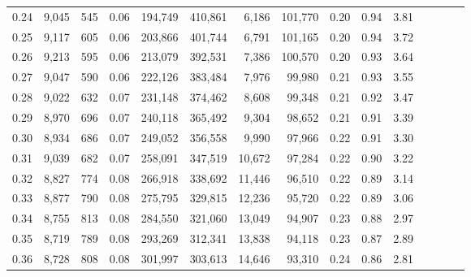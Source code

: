 \begin{tabular}{rrrcrrrrrrrrrrr}
0.24 &  9,045 &    545 &                                       0.06 &  194,749 &  410,861 &    6,186 &  101,770 &  0.20 &  0.94 &                         3.81 \\
0.25 &  9,117 &    605 &                                       0.06 &  203,866 &  401,744 &    6,791 &  101,165 &  0.20 &  0.94 &                         3.72 \\
0.26 &  9,213 &    595 &                                       0.06 &  213,079 &  392,531 &    7,386 &  100,570 &  0.20 &  0.93 &                         3.64 \\
0.27 &  9,047 &    590 &                                       0.06 &  222,126 &  383,484 &    7,976 &   99,980 &  0.21 &  0.93 &                         3.55 \\
0.28 &  9,022 &    632 &                                       0.07 &  231,148 &  374,462 &    8,608 &   99,348 &  0.21 &  0.92 &                         3.47 \\
0.29 &  8,970 &    696 &                                       0.07 &  240,118 &  365,492 &    9,304 &   98,652 &  0.21 &  0.91 &                         3.39 \\
0.30 &  8,934 &    686 &                                       0.07 &  249,052 &  356,558 &    9,990 &   97,966 &  0.22 &  0.91 &                         3.30 \\
0.31 &  9,039 &    682 &                                       0.07 &  258,091 &  347,519 &   10,672 &   97,284 &  0.22 &  0.90 &                         3.22 \\
0.32 &  8,827 &    774 &                                       0.08 &  266,918 &  338,692 &   11,446 &   96,510 &  0.22 &  0.89 &                         3.14 \\
0.33 &  8,877 &    790 &                                       0.08 &  275,795 &  329,815 &   12,236 &   95,720 &  0.22 &  0.89 &                         3.06 \\
0.34 &  8,755 &    813 &                                       0.08 &  284,550 &  321,060 &   13,049 &   94,907 &  0.23 &  0.88 &                         2.97 \\
0.35 &  8,719 &    789 &                                       0.08 &  293,269 &  312,341 &   13,838 &   94,118 &  0.23 &  0.87 &                         2.89 \\
0.36 &  8,728 &    808 &                                       0.08 &  301,997 &  303,613 &   14,646 &   93,310 &  0.24 &  0.86 &                         2.81 \\

\end{tabular}
